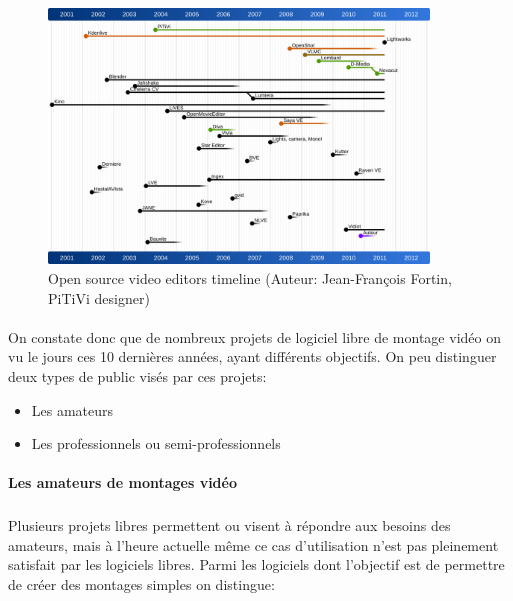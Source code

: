 \begin{figure} [h]
  \begin{center}
    \includegraphics[width=0.9\textwidth]{images/open-source-video-editor-timeline}
  \end{center} \caption{Open source video editors timeline (Auteur:
  Jean-François Fortin, PiTiVi designer)} \label{Yes}
\end{figure}

\paragraph{ }

On constate donc que de nombreux projets de logiciel libre de montage
vidéo on vu le jours ces 10 dernières années, ayant différents
objectifs.  On peu distinguer deux types de public visés par ces
projets:

\begin {itemize}

  \item {Les amateurs}

  \item {Les professionnels ou semi-professionnels}
\end {itemize}

\paragraph {Les amateurs de montages vidéo}

\subparagraph{}

Plusieurs projets libres permettent ou visent à répondre aux besoins
des amateurs, mais à l'heure actuelle même ce cas d'utilisation n'est
pas pleinement satisfait par les logiciels libres. Parmi les logiciels
dont l'objectif est de permettre de créer des montages simples on distingue:

